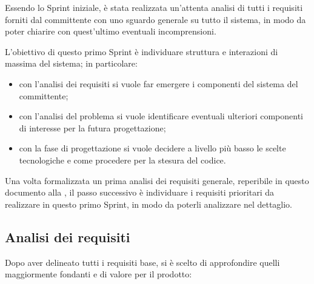 

Essendo lo Sprint iniziale, è stata realizzata un'attenta analisi di tutti i requisiti forniti dal committente
con uno sguardo generale su tutto il sistema, in modo da poter chiarire con quest'ultimo eventuali incomprensioni.

L'obiettivo di questo primo Sprint è individuare struttura e interazioni di massima del sistema; in particolare:
\begin{itemize}
  \item
    con l'analisi dei requisiti si vuole far emergere i componenti del sistema del committente;
  \item
    con l'analisi del problema si vuole identificare eventuali ulteriori componenti di interesse per la futura progettazione;
  \item
    con la fase di progettazione si vuole decidere a livello più basso le scelte tecnologiche e come procedere per la stesura del codice.
\end{itemize}

Una volta formalizzata un prima analisi dei requisiti generale, reperibile in questo documento alla ,
il passo successivo è individuare i requisiti prioritari da realizzare in questo primo Sprint, in modo da poterli analizzare nel dettaglio.

\subsection{Analisi dei requisiti}

Dopo aver delineato tutti i requisiti base, si è scelto di approfondire quelli maggiormente fondanti e di valore per il prodotto:

